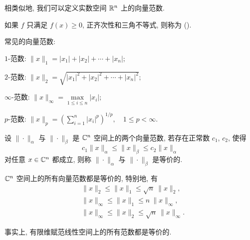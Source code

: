 \begin{note}
	相类似地, 我们可以定义实数空间 $\mathbb{R}^n$ 上的向量范数.
\end{note}

\begin{note}
	如果 $f$ 只满足 $f(x)\geq 0$, 正齐次性和三角不等式,
	则称为  ().
\end{note}

\begin{example}
	常见的向量范数:
	\begin{blist}
		\item $1$-范数:
		$\|x\|_1 = |x_1| + |x_2| + \cdots + |x_n|;$\medskip
		\item $2$-范数:
		$\|x\|_2 = \sqrt{|x_1|^2 + |x_2|^2 + \cdots + |x_n|^2};$\medskip
		\item $\infty$-范数:
		$\|x\|_\infty = \max\limits_{1\leq i\leq n} |x_i|;$\medskip
		\item $p$-范数:
		$\|x\|_p=\left(\sum\limits_{i=1}^n |x_i|^p\right)^{1/p}, \quad 1\leq p< \infty.$
	\end{blist}
\end{example}


\begin{definition}[范数的等价性]
	设 $\|\cdot\|_\alpha$ 与 $\|\cdot\|_\beta$ 是 $\mathbb{C}^n$ 空间上的两个向量范数,
	若存在正常数 $c_1$, $c_2$, 使得
	$$ c_1 \|x\|_\alpha \leq \|x\|_\beta \leq c_2 \|x\|_\alpha $$
	对任意 $x\in\mathbb{C}^n$ 都成立, 则称 $\|\cdot\|_\alpha$ 与 $\|\cdot\|_\beta$
	是等价的.
\end{definition}

\begin{theorem}\label{Th:01-norm10}
	$\mathbb{C}^n$ 空间上的所有向量范数都是等价的, 特别地, 有
	\begin{align*}
		& \|x\|_2 \leq \|x\|_1 \leq \sqrt{n}\ \|x\|_2 ,\\
		& \|x\|_\infty \leq \|x\|_1 \leq n\ \|x\|_\infty, \\
		& \|x\|_\infty \leq \|x\|_2 \leq \sqrt{n}\ \|x\|_\infty.
	\end{align*}
\end{theorem}

\begin{note}
	事实上, 有限维赋范线性空间上的所有范数都是等价的.
\end{note}

